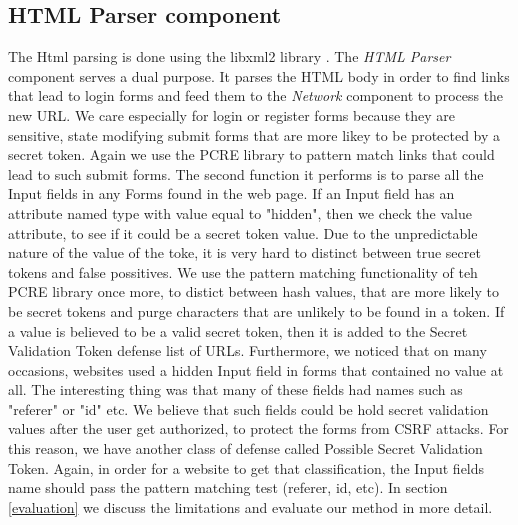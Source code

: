 \subsection{HTML Parser component}
The Html parsing is done using the libxml2 library \cite{website:libxml}. The \emph{HTML Parser} component serves a dual 
purpose.  It parses the HTML body in order to find links that lead to login forms and feed them to the \emph{Network}
component to process the new URL.  We care especially for login or register forms because they are sensitive, state
modifying submit forms that are more likey to be protected by a secret token. Again we use the PCRE library to pattern
match links that could lead to such submit forms. The second function it performs is to parse all the Input fields in 
any Forms found in the web page.  If an Input field has an attribute named type with value equal to "hidden", then 
we check the value attribute, to see if it could be a secret token value.  Due to the unpredictable nature of the 
value of the toke, it is very hard to distinct between true secret tokens and false possitives.  We use
the pattern matching functionality of teh PCRE library once more, to distict between hash values, that are more 
likely to be secret tokens and purge characters that are unlikely to be found in a token.  If a value is believed to
be a valid secret token, then it is added to the Secret Validation Token defense list of URLs.  Furthermore, we noticed
that on many occasions, websites used a hidden Input field in forms that contained no value at all.  The interesting thing
was that many of these fields had names such as "referer" or "id" etc.  We believe that such fields could be hold secret 
validation values after the user get authorized, to protect the forms from CSRF attacks.  For this reason, we have another
class of defense called Possible Secret Validation Token.  Again, in order for a website to get that classification, the
Input fields name should pass the pattern matching test (referer, id, etc).
In section \ref{evaluation} we discuss the limitations and evaluate our method in more detail.   


